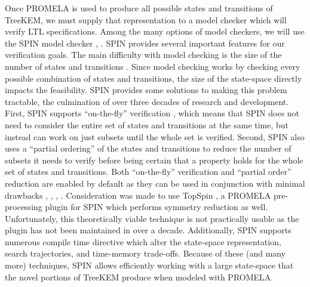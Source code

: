 Once PROMELA is used to produce all possible states and transitions of TreeKEM, we must supply that representation to a model checker which will verify LTL specifications.
Among the many options of model checkers, we will use the SPIN model checker \autocite{godefroid1990using}, \autocite{holzmann1997model}.
SPIN provides several important features for our verification goals.
The main difficulty with model checking is the size of the number of states and transitions \autocite{burch1992symbolic}.
Since model checking works by checking every possible combination of states and transitions, the size of the state-space directly impacts the feasibility.
SPIN provides some solutions to making this problem tractable, the culmination of over three decades of research and development.
First, SPIN supports ``on-the-fly'' verification \autocite{rudin1987limits}, which means that SPIN does not need to consider the entire set of states and transitions at the same time, but instead can work on just subsets until the whole set is verified.
Second, SPIN also uses a ``partial ordering'' of the states and transitions \autocite{shannon1958note} to reduce the number of subsets it needs to verify before being certain that a property holds for the whole set of states and transitions.
Both ``on-the-fly'' verification and ``partial order'' reduction are enabled by default as they can be used in conjunction with minimal drawbacks \autocite{valmari1993fly}, \autocite{peled1994combining}, \autocite{holzmann1995improvement}, \autocite{couvreur1999fly}.
Consideration was made to use TopSpin \autocite{DonaldsonM_AMAST2006}, a PROMELA pre-processing plugin for SPIN which performs symmetry reduction as well.
Unfortunately, this theoretically viable technique is not practically usable as the plugin has not been maintained in over a decade.
Additionally, SPIN supports numerous compile time directive which alter the state-space representation, search trajectories, and time-memory trade-offs.
Because of these (and many more) techniques, SPIN allows efficiently working with a large state-space that the novel portions of TreeKEM produce when modeled with PROMELA.
